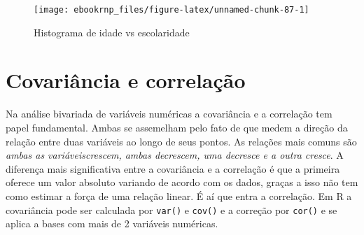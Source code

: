 \documentclass[12pt,]{style/krantz}
\makeatletter
\newenvironment{Shaded}{\begin{snugshade}}{\end{snugshade}}
\newcommand{\KeywordTok}[1]{\textcolor[rgb]{0.13,0.29,0.53}{\textbf{#1}}}
\newcommand{\DataTypeTok}[1]{\textcolor[rgb]{0.13,0.29,0.53}{#1}}
\newcommand{\DecValTok}[1]{\textcolor[rgb]{0.00,0.00,0.81}{#1}}
\newcommand{\StringTok}[1]{\textcolor[rgb]{0.31,0.60,0.02}{#1}}
\newcommand{\OtherTok}[1]{\textcolor[rgb]{0.56,0.35,0.01}{#1}}
\newcommand{\OperatorTok}[1]{\textcolor[rgb]{0.81,0.36,0.00}{\textbf{#1}}}
\newcommand{\NormalTok}[1]{#1}
\newenvironment{kframe}{%
\medskip{}
\setlength{\fboxsep}{.8em}
 \def\at@end@of@kframe{}%
 \ifinner\ifhmode%
  \def\at@end@of@kframe{\end{minipage}}%
  \begin{minipage}{\columnwidth}%
 \fi\fi%
 \def\FrameCommand##1{\hskip\@totalleftmargin \hskip-\fboxsep
 \colorbox{shadecolor}{##1}\hskip-\fboxsep
     \hskip-\linewidth \hskip-\@totalleftmargin \hskip\columnwidth}%
 \MakeFramed {\advance\hsize-\width
   \@totalleftmargin\z@ \linewidth\hsize
   \@setminipage}}%
 {\par\unskip\endMakeFramed%
 \at@end@of@kframe}
\renewenvironment{Shaded}{\begin{kframe}}{\end{kframe}}
\theoremstyle{definition}
\theoremstyle{definition}
\theoremstyle{definition}
\theoremstyle{remark}
\makeatother
\begin{document}
\begin{Shaded}
\end{Shaded}

\begin{figure}[H]

{\centering \texttt{[image: ebookrnp\_files/figure-latex/unnamed-chunk-87-1]} 

}

\caption{Histograma de idade vs escolaridade}\label{fig:unnamed-chunk-87}
\end{figure}

\section{Covariância e correlação}\label{covariancia-e-correlacao}

Na análise bivariada de variáveis numéricas a covariância e a correlação
tem papel fundamental. Ambas se assemelham pelo fato de que medem a
direção da relação entre duas variáveis ao longo de seus pontos. As
relações mais comuns são \emph{ambas as variáveiscrescem, ambas
decrescem, uma decresce e a outra cresce}. A diferença mais
significativa entre a covariância e a correlação é que a primeira
oferece um valor absoluto variando de acordo com os dados, graças a isso
não tem como estimar a força de uma relação linear. É aí que entra a
correlação. Em R a covariância pode ser calculada por \texttt{var()} e
\texttt{cov()} e a correção por \texttt{cor()} e se aplica a bases com
mais de 2 variáveis numéricas.
\end{document}
